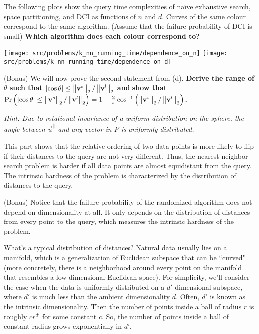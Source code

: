 \documentclass[preview]{standalone}
\begin{document}
\begin{Parts}
\Part


The following plots show the query time complexities of na\"{i}ve exhaustive search, space partitioning, and DCI as functions of $n$ and $d$. Curves of the same colour correspond to the same algorithm. (Assume that the failure probability of DCI is small) {\bf Which algorithm does each colour correspond to?}

\begin{center}
\texttt{[image: src/problems/k\_nn\_running\_time/dependence\_on\_n]}
\texttt{[image: src/problems/k\_nn\_running\_time/dependence\_on\_d]}
\end{center}




\Part  (Bonus)
We will now prove the second statement from (d).
{\bf Derive the range of $\theta$ such that $\left|\cos\theta\right| \leq \left\Vert \vec{v}^{s}\vphantom{v^{l}}\right\Vert _{2} / \left\Vert \vec{v}^{l}\right\Vert _{2}$ and show that \\
$\mathrm{Pr}\left(\left|\cos\theta\right| \leq \left\Vert \vec{v}^{s}\vphantom{v^{l}}\right\Vert _{2} / \left\Vert \vec{v}^{l}\right\Vert _{2}\right) = 1-\frac{2}{\pi}\cos^{-1}\left(\left\Vert \vec{v}^{s}\vphantom{v^{l}}\right\Vert _{2}/\left\Vert \vec{v}^{l}\right\Vert _{2}\right)$. }

\emph{Hint: Due to rotational invariance of a uniform distribution on the sphere, the angle between $\vec{u}^{\parallel}$ and any vector in $P$ is uniformly distributed.}

This part shows that the relative ordering of two data points is more likely to flip if their distances to the query are not very different.
Thus, the nearest neighbor search problem is harder if all data points are almost equidistant from the query.
The intrinsic hardness of the problem is characterized by the distribution of distances to the query.



\Part (Bonus) Notice that the failure probability of the randomized algorithm does not depend on dimensionality at all. It only depends on the distribution of distances from every point to the query, which measures the intrinsic hardness of the problem.

What's a typical distribution of distances? Natural data usually lies on a manifold, which is a generalization of Euclidean subspace that can be ``curved" (more concretely, there is a neighborhood around every point on the manifold that resembles a low-dimensional Euclidean space). For simplicity, we'll consider the case when the data is uniformly distributed on a $d'$-dimensional subspace, where $d'$ is much less than the ambient dimensionality $d$. Often, $d'$ is known as the intrinsic dimensionality. Then the number of points inside a ball of radius $r$ is roughly $cr^{d'}$ for some constant $c$. So, the number of points inside a ball of constant radius grows exponentially in $d'$.


\end{Parts}
\end{document}
